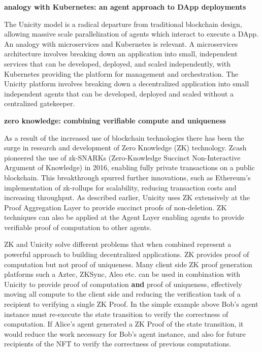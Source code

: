 \documentclass{article}
\begin{document}
\vspace{2mm}
\textbf{analogy with Kubernetes: an agent approach to DApp deployments}
\vspace{2mm}

The Unicity model is a radical departure from traditional blockchain design, allowing massive scale parallelization of agents which interact to execute a DApp. An analogy with microservices and Kubernetes is relevant. A microservices architecture involves breaking down an application into small, independent services that can be developed, deployed, and scaled independently, with Kubernetes providing the platform for management and orchestration. The Unicity platform involves breaking down a decentralized application into small independent agents that can be developed, deployed and scaled without a centralized gatekeeper. 


\vspace{2mm}
\textbf{zero knowledge: combining verifiable compute and  uniqueness}
\vspace{2mm}

As a result of the increased use of blockchain technologies there has been the surge in research and development of Zero Knowledge (ZK) technology. Zcash pioneered the use of zk-SNARKs (Zero-Knowledge Succinct Non-Interactive Argument of Knowledge) in 2016, enabling fully private transactions on a public blockchain. This breakthrough spurred further innovations, such as Ethereum's implementation of zk-rollups for scalability, reducing transaction costs and increasing throughput. As described earlier, Unicity uses ZK extensively at the Proof Aggregation Layer to provide succinct proofs of non-deletion. ZK techniques can also be applied at the Agent Layer enabling agents to provide verifiable proof of computation to other agents.


\vspace{2mm}


ZK and Unicity solve different problems that when combined represent a powerful approach to building decentralized applications. ZK provides proof of computation but not proof of uniqueness. Many client side ZK proof generation platforms such a Aztec, ZKSync, Aleo etc. can be used in combination with Unicity to provide proof of computation \textbf{and} proof of uniqueness, effectively moving all compute to the client side and reducing the verification task of a recipient to verifying a single ZK Proof. In the simple example above Bob's agent instance must re-execute the state transition to verify the correctness of computation. If Alice's agent generated a ZK Proof of the state transition, it would reduce the work necessary for Bob's agent instance, and also for future recipients of the NFT to verify the correctness of previous computations.
\end{document}
